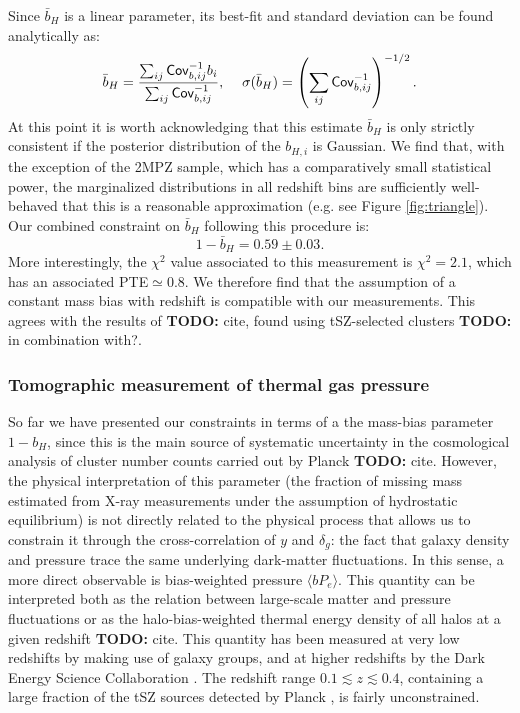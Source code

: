 \documentclass[useAMS,usenatbib]{mn2e}
\newcommand{\todo}[1]{{\bf TODO:} #1}
\begin{document}
      Since $\bar{b}_H$ is a linear parameter, its best-fit and standard deviation can be found analytically as:
      \begin{equation}
        \bar{b}_H=\frac{\sum_{ij}{\sf Cov}_{b,ij}^{-1}b_i}{\sum_{ij}{\sf Cov}^{-1}_{b,ij}},
        \hspace{12pt}
        \sigma(\bar{b}_H)=\left(\sum_{ij}{\sf Cov}^{-1}_{b,ij}\right)^{-1/2}.
      \end{equation}
      At this point it is worth acknowledging that this estimate $\bar{b}_H$ is only strictly consistent if the posterior distribution of the $b_{H,i}$ is Gaussian. We find that, with the exception of the 2MPZ sample, which has a comparatively small statistical power, the marginalized distributions in all redshift bins are sufficiently well-behaved that this is a reasonable approximation (e.g. see Figure \ref{fig:triangle}). Our combined constraint on $\bar{b}_H$ following this procedure is:
      \begin{equation}
        1-\bar{b}_H=0.59\pm0.03.
      \end{equation}
      More interestingly, the $\chi^2$ value associated to this measurement is $\chi^2=2.1$, which has an associated PTE$\simeq0.8$. We therefore find that the assumption of a constant mass bias with redshift is compatible with our measurements. This agrees with the results of \todo{cite}, found using tSZ-selected clusters \todo{in combination with?}.

    \subsubsection{Tomographic measurement of thermal gas pressure}\label{ssec:results.fid.bpe}
      So far we have presented our constraints in terms of a the mass-bias parameter $1-b_H$, since this is the main source of systematic uncertainty in the cosmological analysis of cluster number counts carried out by Planck \todo{cite}. However, the physical interpretation of this parameter (the fraction of missing mass estimated from X-ray measurements under the assumption of hydrostatic equilibrium) is not directly related to the physical process that allows us to constrain it through the cross-correlation of $y$ and $\delta_g$: the fact that galaxy density and pressure trace the same underlying dark-matter fluctuations. In this sense, a more direct observable is bias-weighted pressure $\langle bP_e\rangle$. This quantity can be interpreted both as the relation between large-scale matter and pressure fluctuations or as the halo-bias-weighted thermal energy density of all halos at a given redshift \todo{cite}. This quantity has been measured at very low redshifts by \cite{2017MNRAS.467.2315V} making use of galaxy groups, and at higher redshifts by the Dark Energy Science Collaboration \cite{2019arXiv190413347P}. The redshift range $0.1\lesssim z\lesssim0.4$, containing a large fraction of the tSZ sources detected by Planck \citep{2016A&A...594A..27P}, is fairly unconstrained.
\end{document}
